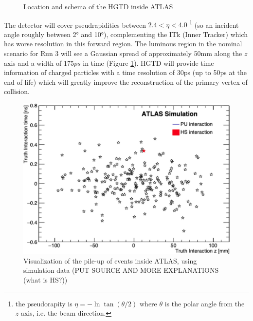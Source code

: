 \begin{figure}
    \centering
    \hfill
    \centering
    \caption{Location and schema of the HGTD inside ATLAS}
\end{figure}

The detector will cover pseudrapidities between $2.4 < \eta < 4.0$ \footnote{the pseudorapity is $\eta=-\ln \tan(\theta/2)$ where $\theta$ is the polar angle from the $z$ axis, i.e. the beam direction.} (so an incident angle roughly between 2° and 10°), complementing the ITk (Inner Tracker) which has worse resolution in this forward region. The luminous region in the nominal scenario for Run 3 will see a Gaussian spread of approximately 50mm along the $z$ axis and a width of 175$\si{ps}$ in time (Figure \ref{fig:events_pileup}). HGTD will provide time information of charged particles with a time resolution of 30ps (up to 50ps at the end of life) which will greatly improve the reconstruction of the primary vertex of collision.


\begin{figure}[!hb]
    \centering
    \includegraphics[width=.8\textwidth]{Images/intro/events_pileup_HL_LHC.jpg}
    \caption{Visualization of the pile-up of events inside ATLAS, using simulation data (PUT SOURCE AND MORE EXPLANATIONS (what is HS?))}
    \label{fig:events_pileup}
\end{figure}
